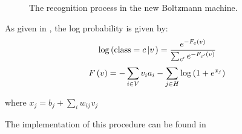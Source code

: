 \begin{figure}[h]
  \centering
  \caption{The recognition process in the new Boltzmann machine.}
\end{figure}



As given in \cite{hinton2010practical}, the log
probability is  given by:
\[ {\log} \left( \operatorname{class} = c \left| v \right. \right) =
   \frac{e^{- F_c \left( v \right)}}{\sum_{c'} e^{- F_{c'} \left( v
   \right)}} \]
\[ F \left( v \right) = - \sum_{i \in V} v_i a_i - \sum_{j \in H} \log \left(
   1  + e^{x_j} \right) \]


where $x_j = b_j + \sum_i w_{ij_{}} v_j$



The implementation of this procedure can be found in

